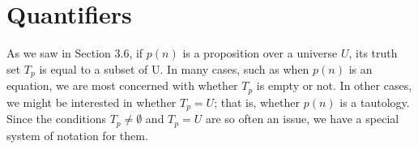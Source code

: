 \documentclass[10pt,]{book}
\theoremstyle{plain}
\theoremstyle{definition}
\theoremstyle{definition}
\theoremstyle{definition}
\theoremstyle{definition}
\begin{document}
\section[Quantifiers]{Quantifiers}\label{c3s8}
\typeout{************************************************}
\typeout{************************************************}
As we saw in Section 3.6, if \(p(n)\) is a proposition over a universe \(U\), its truth set \(T_p\) is equal to a subset of U. In many cases, such as when \(p(n)\) is an equation, we are most concerned with whether \(T_p\) is empty or not. In other cases, we might be interested in whether \(T_p=U\); that is, whether \(p(n)\) is a tautology. Since the conditions \(T_p\neq \emptyset\)  and \(T_p=U\) are so often an issue, we have a special system of notation for them.%
\typeout{************************************************}
\typeout{************************************************}
\end{document}
